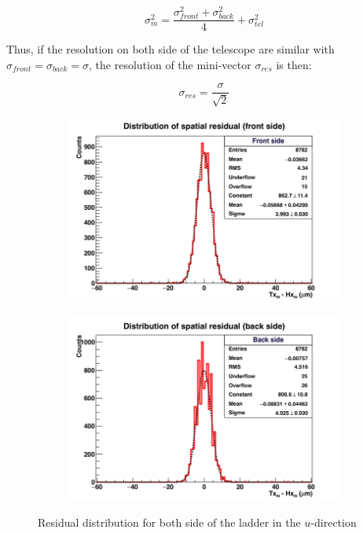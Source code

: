     \begin{equation}
      \sigma_m^2 = \frac{\sigma_{front}^2 + \sigma_{back}^2}{4} + \sigma_{tel}^2
    \end{equation}

    Thus, if the resolution on both side of the telescope are similar with $\sigma_{front} = \sigma_{back} = \sigma$, the resolution of the mini-vector $\sigma_{res}$ is then:

    \begin{equation}
      \sigma_{res} = \frac{\sigma}{\sqrt{2}}
    \end{equation}

    \begin{figure}[!h]
      \centering
      \begin{subfigure}[t]{0.45\textwidth}
        \centering
        \includegraphics[width = 1.2\textwidth]{Pictures/deformation/hxtxFront_226056.png}
      \end{subfigure}
      \quad
      \begin{subfigure}[t]{0.45\textwidth}
        \centering
        \includegraphics[width = 1.2\textwidth]{Pictures/deformation/hxtxBack_226056.png}
      \end{subfigure}
      \caption{Residual distribution for both side of the ladder in the $u$-direction}
      \label{fig:residualFrontBackLadder}
    \end{figure}

